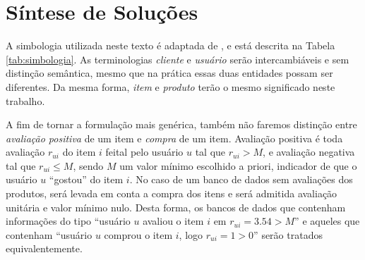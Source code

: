 \chapter[Síntese de Soluções]{Síntese de Soluções}
\label{chap:sintese_de_solucoes}

A simbologia utilizada neste texto é adaptada de \cite{symeonidis2007feature}, e está descrita na Tabela \ref{tab:simbologia}. As terminologias \textit{cliente} e \textit{usuário} serão intercambiáveis e sem distinção semântica, mesmo que na prática essas duas entidades possam ser diferentes. Da mesma forma, \textit{item} e \textit{produto} terão o mesmo significado neste trabalho. 

A fim de tornar a formulação mais genérica, também não faremos distinção entre \textit{avaliação positiva} de um item e \textit{compra} de um item. Avaliação positiva é toda avaliação $r_{ui}$ do item $i$ feital pelo usuário $u$ tal que $r_{ui} > M$, e avaliação negativa tal que $r_{ui} \leq M$, sendo $M$ um valor mínimo escolhido a priori, indicador de que o usuário $u$ ``gostou'' do item $i$. No caso de um banco de dados sem avaliações dos produtos, será levada em conta a compra dos itens e será admitida avaliação unitária e valor mínimo nulo. Desta forma, os bancos de dados que contenham informações do tipo ``usuário $u$ avaliou o item $i$ em $r_{ui} = 3.54 > M$'' e aqueles que contenham ``usuário $u$ comprou o item $i$, logo $r_{ui} = 1 > 0$'' serão tratados equivalentemente.

